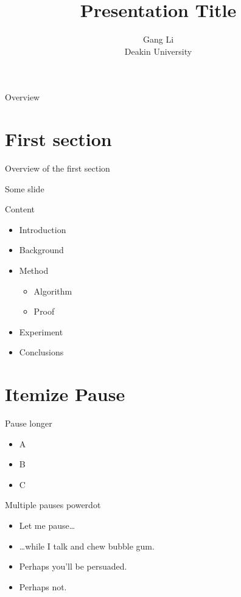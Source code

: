 \documentclass[
 size=12pt,
 paper=smartboard, %
 mode=present, %
 display=slides, %
style=tuliplab,
pauseslide,
fleqn,leqno]{powerdot}
\title{Presentation Title}
\author{
Gang Li
\\
Deakin University 
}
\date{\gitCommitterDate}
\begin{document}
\maketitle 

\begin{slide}[toc=,bm=]{Overview}
\tableofcontents[content=sections]
\end{slide}
\section{First section}
\begin{slide}[toc=,bm=]{Overview of the first section}
\tableofcontents[content=currentsection,type=1]
\end{slide}
\begin{slide}{Some slide}
\end{slide}

\begin{slide}{Content}
  \begin{itemize}
    \item Introduction\pause
    \item Background
    \item Method \pause
      \begin{itemize}
      \item Algorithm
      \item Proof
      \end{itemize}
    \item Experiment
    \item Conclusions
  \end{itemize}
\end{slide}


\section{Itemize Pause}


\begin{slide}{Pause longer}
\begin{itemize}
\item A \pause
\item B \pause[2]
\item C
\end{itemize}
\end{slide}


\begin{slide}{Multiple pauses}
power\pause dot \pause
\begin{itemize}
\item Let me pause\ldots \pause
\item \ldots while I talk \pause and chew bubble gum. \pause
\item Perhaps you’ll be persuaded.
\item Perhaps not.
\end{itemize}
\end{slide}
\end{document}
